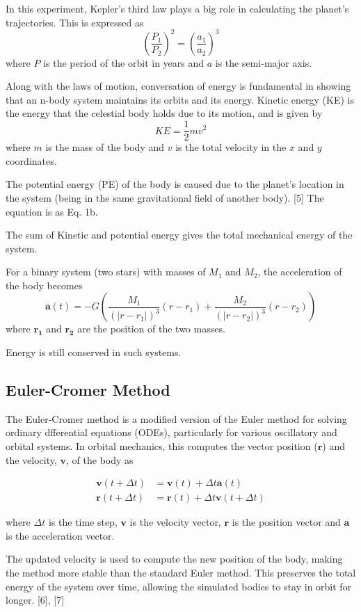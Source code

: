 \documentclass[11 pt, a4paper, twocolumn]{article}
\begin{document}
In this experiment, Kepler's third law plays a big role in calculating the planet's trajectories. 
This is expressed as
\[
\left(\frac{P_1}{P_2}\right)^2 = \left(\frac{a_1}{a_2}\right)^3
\tag{Eq. 5}
\]
where $P$ is the period of the orbit in years and $a$ is the semi-major axis.

Along with the laws of motion, conversation of energy is fundamental in showing that an n-body system
maintains its orbits and its energy. Kinetic energy (KE) is the energy that the celestial body holds 
due to its motion, and is given by
\[
KE = \frac{1}{2}mv^2
\tag{Eq. 6}
\]
where $m$ is the mass of the body and $v$ is the total velocity in the $x$ and $y$ coordinates. 

The potential energy (PE) of the body is caused due to the planet's location in the system (being in the
same gravitational field of another body). [5] The equation is as Eq. 1b.

The sum of Kinetic and potential energy gives the total mechanical energy of the system.

For a binary system (two stars) with masses of $M_1$ and $M_2$, the acceleration of the body becomes
\[
\mathbf{a}(t) = -G\left(\frac{M_1}{(|r - r_1|)^3}(r - r_1) + \frac{M_2}{(|r - r_2|)^3}(r - r_2)\right)
\tag{Eq. 7}
\]
where $\mathbf{r_1}$ and $\mathbf{r_2}$ are the position of the two masses.

Energy is still conserved in such systems.

\subsection{Euler-Cromer Method}
The Euler-Cromer method is a modified version of the Euler method for solving ordinary dfferential 
equations (ODEs), particularly for various oscillatory and orbital systems. In orbital mechanics, 
this computes the vector position ($\mathbf{r}$) and the velocity, $\mathbf{v}$, of the body as

\begin{align}
\mathbf{v}(t+\Delta t) &= \mathbf{v}(t) + \Delta t\mathbf{a}(t) \tag{Eq. 8a}\\
\mathbf{r}(t+\Delta t) &= \mathbf{r}(t) + \Delta t\mathbf{v}(t+\Delta t) \tag{Eq. 8b}
\end{align}

where $\Delta t$ is the time step, $\mathbf{v}$ is the velocity vector, $\mathbf{r}$ is the position 
vector and $\mathbf{a}$ is the acceleration vector.

The updated velocity is used to compute the new position of the body, making the method more stable than
the standard Euler method. This preserves the total energy of the system over time, allowing the simulated 
bodies to stay in orbit for longer. [6], [7]
\end{document}
